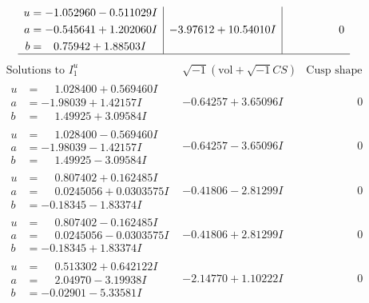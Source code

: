 \documentclass[1p]{elsarticle_modified}
\theoremstyle{definition}
\newcommand{\I}{\sqrt{-1}}
\begin{document}
$$\begin{array}{c|c|c}
\begin{aligned}
u &= -1.052960 - 0.511029 I \\
a &= -0.545641 + 1.202060 I \\
b &= \phantom{-}0.75942 + 1.88503 I\end{aligned}
 & -3.97612 + 10.54010 I & \phantom{-0.000000 } 0\\
 \hline 
 \end{array}$$\newpage$$\begin{array}{c|c|c}  
\text{Solutions to }I^u_{1}& \I (\text{vol} + \sqrt{-1}CS) & \text{Cusp shape}\\
 \hline 
\begin{aligned}
u &= \phantom{-}1.028400 + 0.569460 I \\
a &= -1.98039 + 1.42157 I \\
b &= \phantom{-}1.49925 + 3.09584 I\end{aligned}
 & -0.64257 + 3.65096 I & \phantom{-0.000000 } 0 \\ \hline\begin{aligned}
u &= \phantom{-}1.028400 - 0.569460 I \\
a &= -1.98039 - 1.42157 I \\
b &= \phantom{-}1.49925 - 3.09584 I\end{aligned}
 & -0.64257 - 3.65096 I & \phantom{-0.000000 } 0 \\ \hline\begin{aligned}
u &= \phantom{-}0.807402 + 0.162485 I \\
a &= \phantom{-}0.0245056 + 0.0303575 I \\
b &= -0.18345 - 1.83374 I\end{aligned}
 & -0.41806 - 2.81299 I & \phantom{-0.000000 } 0 \\ \hline\begin{aligned}
u &= \phantom{-}0.807402 - 0.162485 I \\
a &= \phantom{-}0.0245056 - 0.0303575 I \\
b &= -0.18345 + 1.83374 I\end{aligned}
 & -0.41806 + 2.81299 I & \phantom{-0.000000 } 0 \\ \hline\begin{aligned}
u &= \phantom{-}0.513302 + 0.642122 I \\
a &= \phantom{-}2.04970 - 3.19938 I \\
b &= -0.02901 - 5.33581 I\end{aligned}
 & -2.14770 + 1.10222 I & \phantom{-0.000000 } 0 \\ \hline\begin{aligned}

\end{aligned}
\end{array}$$
\end{document}
